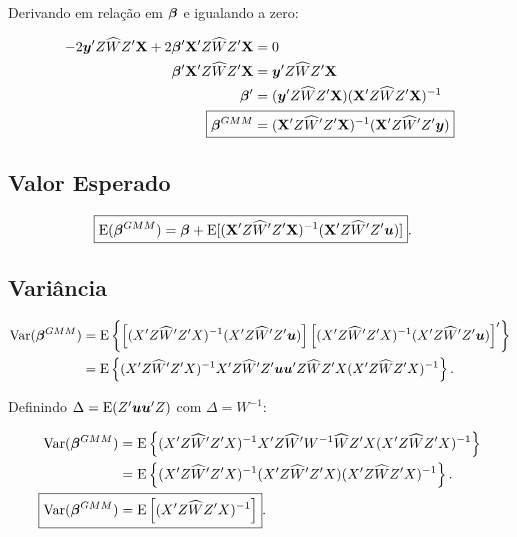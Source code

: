 \documentclass[11pt, oneside, a4paper, article]{article}
\numberwithin{equation}{section}
\begin{document}
\begin{description}
	Derivando em relação em $\boldsymbol{\beta}$ e igualando a zero:

	\vspace{-1 em}
	\begin{align*}
		-2 \yvec' Z \widehat{W} Z' \Xmat + 2 \betavec'\Xmat' Z \widehat{W} Z' \Xmat &= 0
		\\
		\betavec'\Xmat' Z \widehat{W} Z' \Xmat &= \yvec' Z \widehat{W} Z' \Xmat 
		\\
		\betavec' &= ( \yvec' Z \widehat{W} Z' \Xmat ) ( \Xmat' Z \widehat{W} Z' \Xmat )^{-1}
		\\
		\Aboxed{
		\betavec^{GMM} &= ( \Xmat' Z \widehat{W}' Z' \Xmat )^{-1} ( \Xmat' Z \widehat{W}' Z' \yvec ) }
	\end{align*}

	\subsection{Valor Esperado} 

	\vspace{-1 em}
	\begin{align*}
		\Aboxed{
			\E( \betavec^{GMM} ) &=
			\betavec +
		\E[ ( \Xmat' Z \widehat{W}' Z' \Xmat )^{-1} ( \Xmat' Z \widehat{W}' Z' \uvec ) ] }.
	\end{align*}

	\subsection{Variância} 

	\vspace{-1 em}
	\begin{align*}
		\text{Var}( \boldsymbol{\beta}^{GMM} ) &=
		\text{E} \left\{ 
			\left[ ( X' Z \widehat{W}' Z' X )^{-1} ( X' Z \widehat{W}' Z' \boldsymbol{u} ) \right]
			\left[ ( X' Z \widehat{W}' Z' X )^{-1} ( X' Z \widehat{W}' Z' \boldsymbol{u} ) \right]'
		\right\}
		\\ &=
		\text{E} \left\{ 
			( X' Z \widehat{W}' Z' X )^{-1}
			X' Z \widehat{W}' Z' \boldsymbol{u} \boldsymbol{u}' Z \widehat{W} Z' X 
			( X' Z \widehat{W} Z' X )^{-1}
		\right\}.
	\end{align*}

	\noindent
	Definindo $\Delta = \text{E}(Z' \boldsymbol{u}\boldsymbol{u}' Z)$ com $\Delta = W^{-1}$:

	\vspace{-1 em}
	\begin{align*}
		\Var( \betavec^{GMM} ) &=
		\E \left\{ 
			( X' Z \widehat{W}' Z' X )^{-1}
			X' Z \widehat{W}' W^{-1} \widehat{W} Z' X 
			( X' Z \widehat{W} Z' X )^{-1}
		\right\}
		\\ &=
		\E \left\{ 
			( X' Z \widehat{W}' Z' X )^{-1}
			( X' Z \widehat{W}' Z' X )
			( X' Z \widehat{W} Z' X )^{-1}
		\right\}.
		\\
		\Aboxed{
			\Var( \betavec^{GMM} ) &=
			\E \left[
				( X' Z \widehat{W} Z' X )^{-1}
		\right] }.
	\end{align*}


\end{description}
\end{document}
